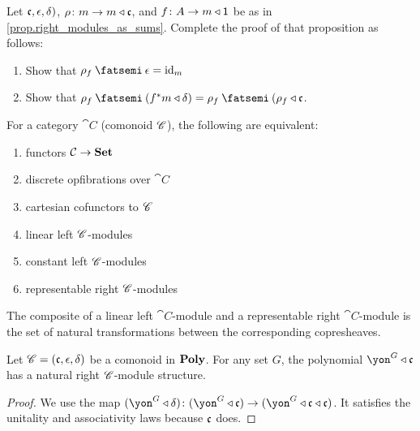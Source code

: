 \documentclass[DynamicalBook]{subfiles}
\begin{document}
\begin{exercise}\label{exc.right_modules_as_sums}
Let $\mathfrak{c},\epsilon,\delta)$, $\rho\colon m\to m\mathbin{\triangleleft}\mathfrak{c}$, and $f\colon A\to m\mathbin{\triangleleft}\textsf{1}$ be as in \cref{prop.right_modules_as_sums}. Complete the proof of that proposition as follows:
\begin{enumerate}
	\item Show that $\rho_f\then\epsilon=\id_m$
	\item Show that $\rho_f\then(f^*m\tri\delta)=\rho_f\then(\rho_f\tri\ema{c}$.
\qedhere
\end{enumerate}
\end{exercise}

\begin{example}

\end{example}

\begin{theorem}\label{thm.tfae_c_sets}
For a category $\cat{C}$ (comonoid $\mathscr{C}$), the following are equivalent:
\begin{enumerate}
	\item functors $\mathcal{C}\to\textbf{Set}$
	\item discrete opfibrations over $\cat{C}$
	\item cartesian cofunctors to $\mathscr{C}$
	\item linear left $\mathscr{C}$-modules
	\item constant left $\mathscr{C}$-modules
	\item representable right $\mathscr{C}$-modules
\end{enumerate}
\end{theorem}

\begin{proposition}
The composite of a linear left $\cat{C}$-module and a representable right $\cat{C}$-module is the set of natural transformations between the corresponding copresheaves.
\end{proposition}

\begin{proposition}\label{prop.all_free_modules}
Let $\mathscr{C}=(\mathfrak{c},\epsilon,\delta)$ be a comonoid in $\textbf{Poly}$. For any set $G$, the polynomial $\yon^G\tri\ema{c}$ has a natural right $\mathscr{C}$-module structure.
\end{proposition}
\begin{proof}
We use the map $(\yon^G\tri\delta)\colon(\yon^G\tri\ema{c})\to(\yon^G\tri\ema{c}\tri\ema{c})$. It satisfies the unitality and associativity laws because $\mathfrak{c}$ does.
\end{proof}
\end{document}

